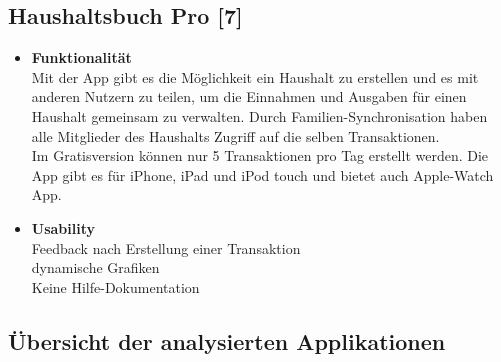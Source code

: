 \documentclass[runningheads,a4paper]{llncs}
\begin{document}
\clearpage

\subsection{Haushaltsbuch Pro [7]}
\begin{itemize} 

\item\textbf{Funktionalität}\\
Mit der App gibt es die Möglichkeit ein Haushalt zu erstellen und es mit anderen Nutzern zu teilen, um die Einnahmen und Ausgaben für einen Haushalt gemeinsam zu verwalten. Durch Familien-Synchronisation haben alle Mitglieder des Haushalts Zugriff auf die selben Transaktionen. \\
Im Gratisversion können nur 5 Transaktionen pro Tag erstellt werden. Die App gibt es für iPhone, iPad und iPod touch und bietet auch Apple-Watch App.\\

\item\textbf{Usability}\\

\textcolor{green}{}	Feedback nach Erstellung einer Transaktion\\
\textcolor{green}{}	dynamische Grafiken\\
\textcolor{red}{}	Keine Hilfe-Dokumentation\\

\end{itemize}

\begin{figure}
\centering
{}
\end{figure}
\clearpage


\subsection{Übersicht der analysierten Applikationen}
\end{document}
